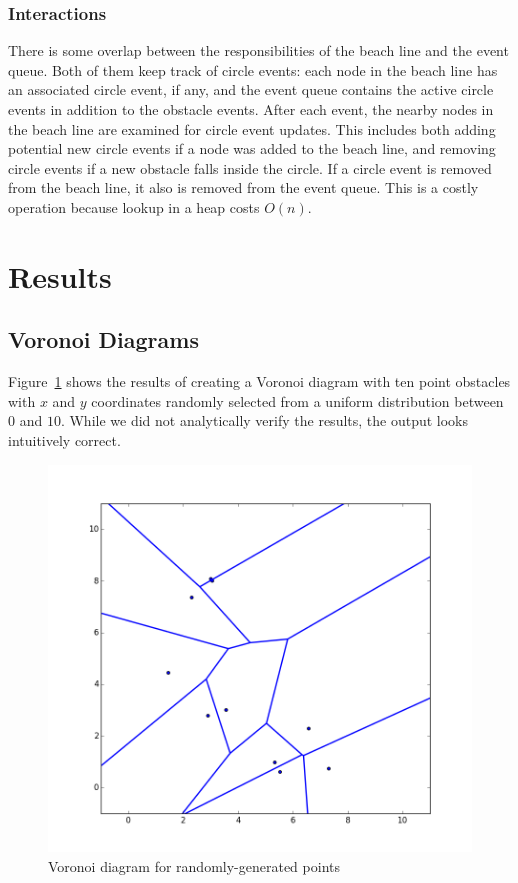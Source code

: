 \documentclass[conference]{IEEEtran}
\begin{document}
\subsubsection{Interactions}
There is some overlap between the responsibilities of the beach line and the event
queue. Both of them keep track of circle events: each node in the beach line
has an associated circle event, if any, and the event queue contains the
active circle events in addition to the obstacle events. After each event,
the nearby nodes in the beach line are examined for circle event updates. This
includes both adding potential new circle events if a node was added to the
beach line, and removing circle events if a new obstacle falls inside the
circle. If a circle event is removed from the beach line, it also is removed
from the event queue. This is a costly operation because lookup in a heap
costs $O(n)$.

\section{Results}
\subsection{Voronoi Diagrams}
Figure~\ref{voronoi} shows the results of creating a Voronoi diagram with ten
point obstacles with $x$ and $y$ coordinates randomly selected from a uniform
distribution between $0$ and $10$. While we did not analytically verify the
results, the output looks intuitively correct.

\begin{figure}[tp]
    \includegraphics[width=\columnwidth]{ten_random_points_voronoi}
    \caption{Voronoi diagram for randomly-generated points}\label{voronoi}
\end{figure}
\end{document}

